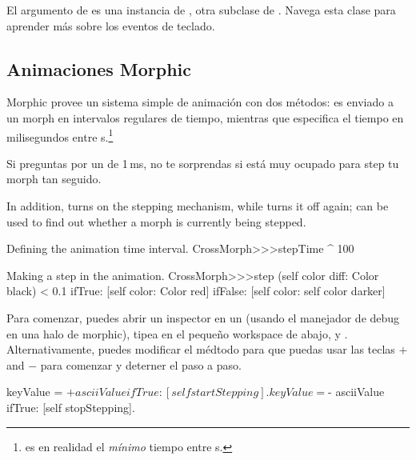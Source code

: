 \documentclass[a4paper,10pt,twoside]{book}
\begin{document}
El argumento  de  es una instancia de , otra subclase de . Navega esta clase para aprender m\'as sobre los eventos de teclado. 

\subsection{Animaciones Morphic}

Morphic provee un sistema simple de animaci\'on con dos m\'etodos:  es enviado a un morph en intervalos regulares de tiempo, mientras que  especifica el tiempo en milisegundos entre s.\footnote{ es en realidad el \emph{m\'inimo} tiempo entre s.}

Si preguntas por un  de 1\,ms, no te sorprendas si \pharo est\'a muy ocupado para step tu morph tan seguido.

In addition, 
 turns on the stepping mechanism, while  turns it off again;   can be used to find out whether a morph is currently being stepped.

\begin{method}{Defining the animation time interval.}
CrossMorph>>>stepTime
	^ 100
\end{method}
\begin{method}{Making a step in the animation.}
CrossMorph>>>step
	(self color diff: Color black) < 0.1
		ifTrue: [self color: Color red]
		ifFalse: [self color: self color darker]
\end{method}
\noindent

Para comenzar, puedes abrir un inspector en un   (usando el manejador de debug \debugHandle{} en una halo de morphic), tipea  en el peque\~no workspace de abajo, y .
Alternativamente, puedes modificar el m\'edtodo   para que puedas usar las teclas $+$ and $-$  para comenzar y deterner el paso a paso.



\begin{code}{}
	keyValue = $+ asciiValue 
		ifTrue: [self startStepping].
	keyValue = $- asciiValue
		ifTrue: [self stopStepping].
\end{code}
\end{document}
